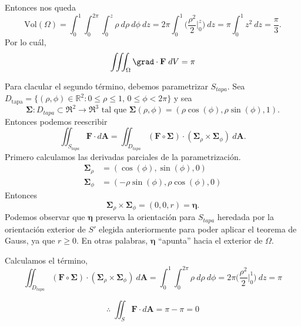 \begin{solution}
    Entonces nos queda    \[
        \text{Vol}(\Omega) =  \int_0^1  \int_0^{2\pi} \int_0^z  \rho\:d\rho\:d\phi \:dz=2\pi  \int_0^1\Big( \frac{\rho^2}{2}\Big|_0^z \Big) \:dz =  \pi   \int_0^1   z^2  \:dz= \frac{ \pi}{3}.
    \] Por lo cuál, 
     \begin{align*}
        \iiint _\Omega \grad \cdot \mathbf{F}\;dV =\pi
    \end{align*}

    Para clacular el segundo término, debemos parametrizar $S_{tapa}$.  Sea  $D_{\text{tapa}} = \{ (\rho, \phi) \in \mathbb{R}^2 : 0 \leq \rho \leq 1, \, 0 \leq \phi < 2\pi \}$ y  sea  $$\boldsymbol{\Sigma}:D_{tapa}\subset\Re^2\to\Re^3  \mbox{ tal que }   \boldsymbol{\Sigma}(\rho,\phi)=(\rho\cos(\phi),\rho\sin(\phi),1).$$
    Entonces podemos reescribir
    \[
        \iint _{S_{tapa}} \mathbf{F}\cdot d\mathbf{A}=\iint _{D_{tapa}} (\mathbf{F}\circ\boldsymbol{\Sigma})\cdot
        (\boldsymbol{\Sigma}_{\rho}\times\boldsymbol{\Sigma}_{\phi})\:d\mathbf{A}.
    \]
    Primero calculamos las derivadas parciales de la parametrizaci\'on.
    \begin{align*}
        \boldsymbol{\Sigma}_{\rho} & =(\cos(\phi),\sin(\phi),0) \\
        \boldsymbol{\Sigma}_{\phi} & =(-\rho \sin(\phi),\rho \cos(\phi),0)
    \end{align*}
    Entonces
    \[
        \boldsymbol{\Sigma}_{\rho}\times\boldsymbol{\Sigma}_{\phi}=(0,0,r)=\boldsymbol{\eta}.
    \]
    Podemos observar que $\boldsymbol{\eta}$ preserva la orientaci\'on  para $S_{tapa}$ heredada  por la orientaci\'on exterior de $S'$ elegida anteriormente para poder aplicar el teorema de Gauss, ya que $r\geq0$. En otras palabras,  $\boldsymbol{\eta}$ ``apunta''  hacia el exterior de $\Omega$.  
   
    Calculamos el término, 
    \[
         \iint _{D_{tapa}} (\mathbf{F}\circ\boldsymbol{\Sigma})\cdot
        (\boldsymbol{\Sigma}_{\rho}\times\boldsymbol{\Sigma}_{\phi})\:d\mathbf{A}=\int_0^1  \int_0^{2\pi}   \rho\:d\rho\:d\phi =2\pi  \Big( \frac{\rho^2}{2}\Big|_0^1 \Big) \:dz =  \pi   
    \]

    $$\therefore\;\iint _{S} \mathbf{F}\cdot d\mathbf{A}=\pi - \pi=0$$
\end{solution}



